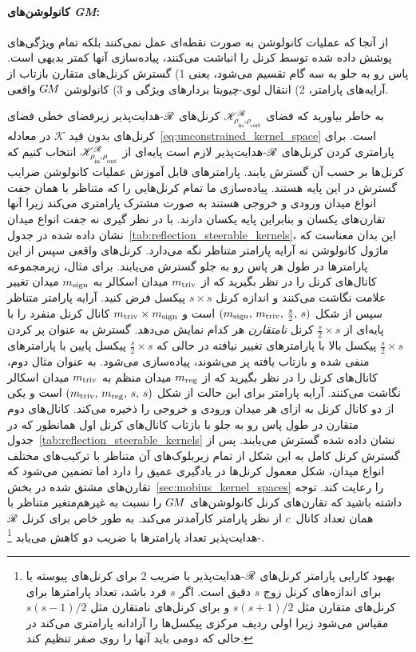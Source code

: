 \paragraph{کانولوشن‌های \textit{GM}:}
از آنجا که عملیات کانولوشن به صورت نقطه‌ای عمل نمی‌کنند بلکه تمام ویژگی‌های پوشش داده شده توسط کرنل را انباشت می‌کنند، پیاده‌سازی آنها کمتر بدیهی است.
پاس رو به جلو به سه گام تقسیم می‌شود، یعنی
1) گسترش کرنل‌های متقارن بازتاب از آرایه‌های پارامتر،
2) انتقال لوی-چیویتا بردارهای ویژگی و
3) کانولوشن $G\mkern-1.4muM$ واقعی.

به خاطر بیاورید که فضای $\KR$ کرنل‌های $\mathscr{R}$-هدایت‌پذیر زیرفضای خطی فضای کرنل‌های بدون قید $\mathscr{K}$ در معادله~\eqref{eq:unconstrained_kernel_space} است.
برای پارامتری کردن کرنل‌های $\mathscr{R}$-هدایت‌پذیر لازم است پایه‌ای از $\KR$ انتخاب کنیم که کرنل‌ها بر حسب آن گسترش یابند.
پارامترهای قابل آموزش عملیات کانولوشن ضرایب گسترش در این پایه هستند.
پیاده‌سازی ما تمام کرنل‌هایی را که متناظر با همان جفت انواع میدان ورودی و خروجی هستند به صورت مشترک پارامتری می‌کند
زیرا آنها تقارن‌های یکسان و بنابراین پایه یکسان دارند.
با در نظر گیری نه جفت انواع میدان نشان داده شده در جدول~\ref{tab:reflection_steerable_kernels}، این بدان معناست که ماژول کانولوشن نه آرایه پارامتر متناظر نگه می‌دارد.
کرنل‌های واقعی سپس از این پارامترها در طول هر پاس رو به جلو گسترش می‌یابند.
برای مثال، زیرمجموعه کانال‌های کرنل را در نظر بگیرید که از $m_{\textup{triv}}$ میدان اسکالر به $m_{\textup{sign}}$ میدان تغییر علامت نگاشت می‌کنند و اندازه کرنل $s\times s$ پیکسل فرض کنید.
آرایه پارامتر متناظر سپس از شکل $(m_{\textup{sign}},\, m_{\textup{triv}},\, \frac{s}{2},\, s)$ است و $m_{\textup{triv}}\times m_{\textup{sign}}$ کانال کرنل منفرد را با پایه‌ای از $\frac{s}{2}\times s$ کرنل \emph{نامتقارن} هر کدام نمایش می‌دهد.
گسترش به عنوان پر کردن $\frac{s}{2}\times s$ پیکسل بالا با پارامترهای تغییر نیافته در حالی که $\frac{s}{2}\times s$ پیکسل پایین با پارامترهای منفی شده و بازتاب یافته پر می‌شوند، پیاده‌سازی می‌شود.
به عنوان مثال دوم، کانال‌های کرنل را در نظر بگیرید که از $m_{\textup{reg}}$ میدان منظم به $m_{\textup{triv}}$ میدان اسکالر نگاشت می‌کنند.
آرایه پارامتر برای این حالت از شکل $(m_{\textup{triv}},\, m_{\textup{reg}},\, s,\, s)$ است و یکی از دو کانال کرنل به ازای هر میدان ورودی و خروجی را ذخیره می‌کند.
کانال‌های دوم متقارن در طول پاس رو به جلو با بازتاب کانال‌های کرنل اول همانطور که در جدول~\ref{tab:reflection_steerable_kernels} نشان داده شده گسترش می‌یابند.
پس از گسترش کرنل کامل به این شکل از تمام زیربلوک‌های آن متناظر با ترکیب‌های مختلف انواع میدان، شکل معمول کرنل‌ها در یادگیری عمیق را دارد اما تضمین می‌شود که تقارن‌های مشتق شده در بخش~\ref{sec:mobius_kernel_spaces} را رعایت کند.
توجه داشته باشید که تقارن‌های کرنل کانولوشن‌های $G\mkern-1.4muM$ را نسبت به \CNN غیرهم‌متغیر متناظر با همان تعداد کانال~$c$ از نظر پارامتر کارآمدتر می‌کند.
به طور خاص برای کرنل $\mathscr{R}$-هدایت‌پذیر تعداد پارامترها با ضریب دو کاهش می‌یابد%
\footnote{
	بهبود کارایی پارامتر کرنل‌های $\mathscr{R}$-هدایت‌پذیر با ضریب $2$ برای کرنل‌های پیوسته یا برای اندازه‌های کرنل زوج $s$ دقیق است.
	اگر $s$ فرد باشد، تعداد پارامترها برای کرنل‌های متقارن مثل $s(s+1)/2$ و برای کرنل‌های نامتقارن مثل $s(s-1)/2$ مقیاس می‌شود زیرا اولی ردیف مرکزی پیکسل‌ها را آزادانه پارامتری می‌کند در حالی که دومی باید آنها را روی صفر تنظیم کند.
}.



